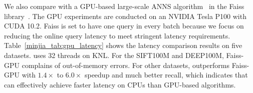 We also compare \Hammer with a GPU-based large-scale ANNS algorithm~\cite{johnson2017billion} in the Faiss library~\cite{faiss-code}. The GPU experiments are conducted on an NVIDIA Tesla P100 with CUDA 10.2. Faiss is set to have one query in every batch because we focus on reducing the online query latency to meet stringent latency requirements.
Table~\ref{minjia_tab:gpu_latency} shows the latency comparison results on five datasets. \Hammer uses 32 threads on KNL.
For the SIFT100M and DEEP100M, Faiss-GPU complains of out-of-memory errors. 
For other datasets, \Hammer outperforms Faiss-GPU with $1.4\times$ to $6.0\times$ speedup and much better recall, which indicates that \Hammer can effectively achieve faster latency on CPUs than GPU-based algorithms.



